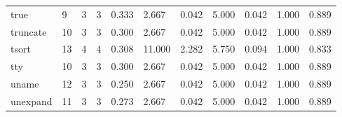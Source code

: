 \begin{longtable}{lp{1.8cm}p{1.8cm}p{1.8cm}p{1.8cm}p{1.8cm}p{1.8cm}p{1.8cm}p{1.8cm}p{1.8cm}p{1.8cm}}
true      &                            9 &                  3 &                                 3 &                                      0.333 &                                  2.667 &                                        0.042 &                             5.000 &                                   0.042 &                              1.000 &                                              0.889 \\
truncate  &                           10 &                  3 &                                 3 &                                      0.300 &                                  2.667 &                                        0.042 &                             5.000 &                                   0.042 &                              1.000 &                                              0.889 \\
tsort     &                           13 &                  4 &                                 4 &                                      0.308 &                                 11.000 &                                        2.282 &                             5.750 &                                   0.094 &                              1.000 &                                              0.833 \\
tty       &                           10 &                  3 &                                 3 &                                      0.300 &                                  2.667 &                                        0.042 &                             5.000 &                                   0.042 &                              1.000 &                                              0.889 \\
uname     &                           12 &                  3 &                                 3 &                                      0.250 &                                  2.667 &                                        0.042 &                             5.000 &                                   0.042 &                              1.000 &                                              0.889 \\
unexpand  &                           11 &                  3 &                                 3 &                                      0.273 &                                  2.667 &                                        0.042 &                             5.000 &                                   0.042 &                              1.000 &                                              0.889 \\

\end{longtable}
